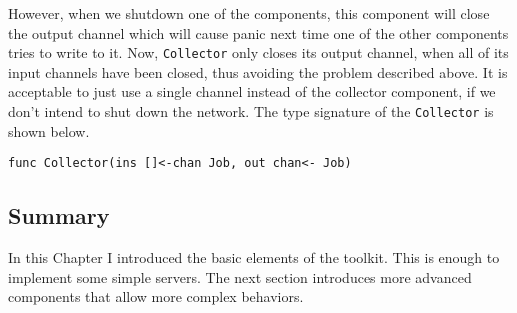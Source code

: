 However, when we shutdown
one of the components, this component will close the output channel
which will cause panic next time one of the other components tries to write
to it. Now, \texttt{Collector} only closes its output channel, when
all of its input channels have been closed, thus avoiding the problem 
described above. It is acceptable to just use a single channel instead of
the collector component, if we don't intend to shut down the network.
The type signature of the \texttt{Collector} is shown below.
\begin{lstlisting}
func Collector(ins []<-chan Job, out chan<- Job)
\end{lstlisting}


\subsection{Summary}
In this Chapter I introduced the basic elements of the toolkit. This 
is enough to implement some simple servers. The next section introduces
more advanced components that allow more complex behaviors.

